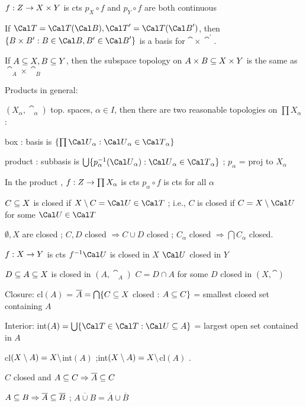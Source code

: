 \hsk $f : Z\rightarrow X\times Y$ is cts \lra $p_X\circ f$ and $p_Y\circ f$ are both continuous

\hsk If $\cat=\cat(\cab), \cat^\prime = \cat(\cab^\prime)$, then $\{B\times B^\prime : B\in\cab, B^\prime\in\cab^\prime\}$ is a 
basis for $\cat\times\cat^\prime$.

\hsk If $A\subseteq X, B\subseteq Y$, then the subspace topology on $A\times B\subseteq X\times Y$ is the same as $\cat_A\times \cat_B$

\ssk

\ni Products in general:

$(X_\alpha,\cat_\alpha)$ top. spaces, $\alpha\in I$, then there are two reasonable topologies on $\prod X_\alpha$: 

\hsk box \top: basis is $\{\prod\cau_\alpha : \cau_\alpha\in\cat_\alpha\}$

\hsk product \top: subbasis is $\bigcup\{p_{\alpha}^{-1}(\cau_\alpha) : \cau_\alpha\in\cat_\alpha\}$ ; $p_\alpha$ = proj to $X_\alpha$

In the product \top, $f: Z\rightarrow \prod X_\alpha$ is cts \lra $p_{\alpha}\circ f$ is cts for all $\alpha$

\msk


$C\subseteq X$ is closed if $X\setminus C = \cau\in \cat$ \hsk ; \hsk i.e., $C$ is closed if $C=X\smin \cau$ for some $\cau\in\cat$

\hsk $\emptyset, X$ are closed ; $C,D$ closed $\Rightarrow C\cup D$ closed ; $C_\alpha$ closed $\Rightarrow \bigcap C_\alpha$ closed.

\hsk $f : X\rightarrow Y$ is cts \lra $\finv\cau$ is closed in $X$ \foa $\cau$ closed in $Y$

\hsk $D\subseteq A\subseteq X$ is closed in $(A,\cat_A)$ \lra $C=D\cap A$ for some $D$ closed in $(X,\cat)$

\ssk

Closure:  cl$(A)$ = $\overline{A} = \bigcap\{C\subseteq X$ closed : $A\subseteq C\}$ = smallest closed set containing $A$

Interior: int$(A) = \bigcup\{\cat\in\cat : \cau\sset A\}$ = largest open set contained in $A$

\hsk cl$(X\setminus A) = X\setminus$int$(A)$ \hsk ;\hsk int$(X\setminus A) = X\setminus$cl$(A)$ .

\hsk $C$ closed and $A\subseteq C \Rightarrow \overline{A}\subseteq C$

\hsk $A\subseteq B \Rightarrow \overline{A}\subseteq\overline{B}$ \hsk ; \hsk $\overline{A\cup B} = \overline{A}\cup\overline{B}$

